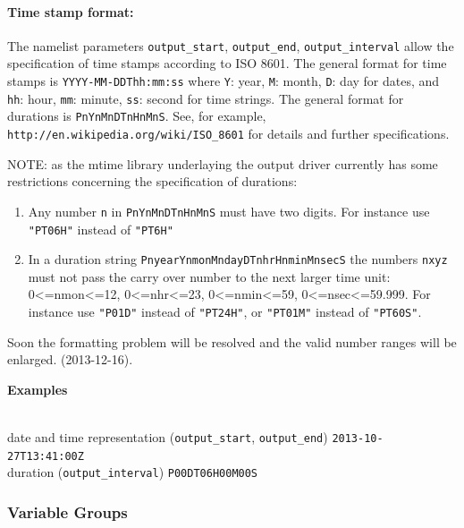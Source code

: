 \paragraph{Time stamp format:}

The namelist parameters \texttt{output\_start}, \texttt{output\_end}, \texttt{output\_interval} allow
the specification of time stamps according to ISO 8601.
The general format for time stamps is \texttt{YYYY-MM-DDThh:mm:ss}
where \texttt{Y}: year, \texttt{M}: month, \texttt{D}: day for dates,
and   \texttt{hh}: hour, \texttt{mm}: minute, \texttt{ss}: second for time strings.
The general format for durations is \texttt{PnYnMnDTnHnMnS}.
See, for example, \texttt{http://en.wikipedia.org/wiki/ISO\_8601} for details and further specifications.

\color{red}NOTE: as the mtime library underlaying the output driver
  currently has some restrictions concerning the specification of durations:\begin{enumerate}
\item Any number \texttt{n} in \texttt{PnYnMnDTnHnMnS} must have two digits. For instance use \texttt{"PT06H"} instead of \texttt{"PT6H"}
\item In a duration string \texttt{PnyearYnmonMndayDTnhrHnminMnsecS} the numbers \texttt{nxyz} must not pass the carry over number to the next larger time unit: 0<=nmon<=12, 0<=nhr<=23, 0<=nmin<=59, 0<=nsec<=59.999. For instance use \texttt{"P01D"} instead of \texttt{"PT24H"}, or \texttt{"PT01M"} instead of \texttt{"PT60S"}.
\end{enumerate}

Soon the formatting problem will be resolved and the valid number ranges will be enlarged.
(2013-12-16).\color{black}

\begin{tabbing}
  \parbox{0.7\textwidth}{\textbf{Examples}} \= \\
  date and time representation (\texttt{output\_start}, \texttt{output\_end}) \>
  \texttt{2013-10-27T13:41:00Z} \\
  duration (\texttt{output\_interval}) \>
  \texttt{P00DT06H00M00S} \\
\end{tabbing}



\subsubsection*{Variable Groups}
